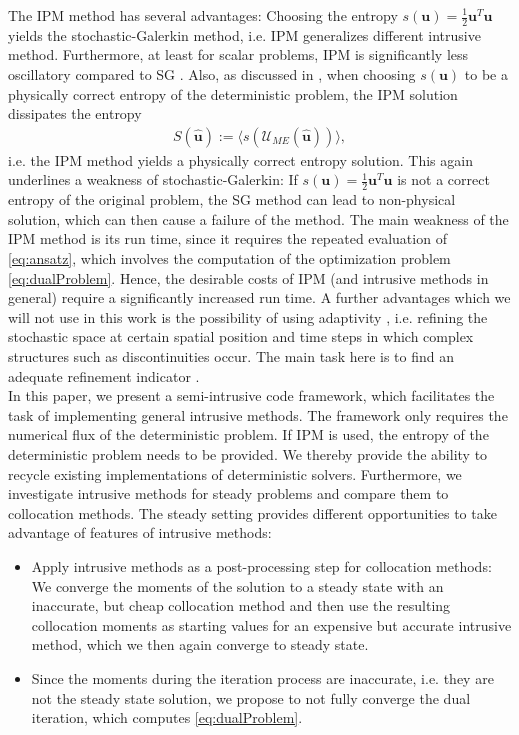 The IPM method has several advantages: Choosing the entropy $s(\bm{u}) = \frac{1}{2}\bm{u}^T\bm{u}$ yields the stochastic-Galerkin method, i.e. IPM generalizes different intrusive method. Furthermore, at least for scalar problems, IPM is significantly less oscillatory compared to SG \cite{kusch2017maximum}. Also, as discussed in \cite{poette2009uncertainty}, when choosing $s(\bm u)$ to be a physically correct entropy of the deterministic problem, the IPM solution dissipates the entropy
\begin{align*}
S(\bm{\hat u}) := \langle s( \mathcal{U}_{ME}(\bm{\hat u}))\rangle,
\end{align*}
i.e. the IPM method yields a physically correct entropy solution. This again underlines a weakness of stochastic-Galerkin: If $s(\bm{u}) = \frac{1}{2}\bm{u}^T\bm{u}$ is not a correct entropy of the original problem, the SG method can lead to non-physical solution, which can then cause a failure of the method. The main weakness of the IPM method is its run time, since it requires the repeated evaluation of \eqref{eq:ansatz}, which involves the computation of the optimization problem \eqref{eq:dualProblem}. Hence, the desirable costs of IPM (and intrusive methods in general) require a significantly increased run time. A further advantages which we will not use in this work is the possibility of using adaptivity \cite{kroker2012finite}, i.e. refining the stochastic space at certain spatial position and time steps in which complex structures such as discontinuities occur. The main task here is to find an adequate refinement indicator \cite{kroker2012finite,giesselmann2017posteriori}.\\

In this paper, we present a semi-intrusive code framework, which facilitates the task of implementing general intrusive methods. The framework only requires the numerical flux of the deterministic problem. If IPM is used, the entropy of the deterministic problem needs to be provided. We thereby provide the ability to recycle existing implementations of deterministic solvers.
Furthermore, we investigate intrusive methods for steady problems and compare them to collocation methods. The steady setting provides different opportunities to take advantage of features of intrusive methods: 
\begin{itemize}
\item Apply intrusive methods as a post-processing step for collocation methods: We converge the moments of the solution to a steady state with an inaccurate, but cheap collocation method and then use the resulting collocation moments as starting values for an expensive but accurate intrusive method, which we then again converge to steady state. 
\item Since the moments during the iteration process are inaccurate, i.e. they are not the steady state solution, we propose to not fully converge the dual iteration, which computes \eqref{eq:dualProblem}. 
\end{itemize}

